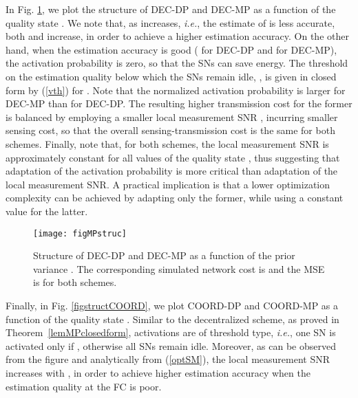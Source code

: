 \documentclass[10pt,twocolumn,twoside]{IEEEtran}
\theoremstyle{plain}
\begin{document}
In Fig. \ref{figstruct}, we plot the structure of DEC-DP and DEC-MP as a function of the quality state .
We note that, as  increases,
\emph{i.e.}, the estimate of  is less accurate,
 both  and  increase,
 in order to achieve a higher estimation accuracy.
 On the other hand, when the estimation accuracy is good ( for DEC-DP and  for DEC-MP),
  the activation probability is zero, so that the SNs can
 save energy.
 The threshold on the estimation quality below which the SNs remain idle, , is given in closed form by (\ref{vth}) for .
Note that the normalized activation probability is larger for DEC-MP than for DEC-DP. The resulting higher transmission cost for the former is balanced
by employing a smaller local measurement SNR , incurring smaller sensing cost,
 so that the overall sensing-transmission cost is the same for both schemes.
Finally, note that, for both schemes, the local measurement SNR is approximately constant for all values of the quality state , thus suggesting
that adaptation of the activation probability is more critical than adaptation of the local measurement SNR. 
A practical implication is that
a lower optimization complexity can be achieved by 
adapting only the former, while
using a constant value for the latter.

\begin{figure}[t]
\centering
\texttt{[image: figMPstruc]}
\vspace{-3mm}
\caption{Structure of DEC-DP and  DEC-MP  as a function of the prior variance .
The corresponding simulated network cost is  and the MSE is  for both schemes.}\vspace{-5mm}
\label{figstruct}
\end{figure}



Finally, in Fig. \ref{figstructCOORD}, we plot COORD-DP and COORD-MP as a function of the quality state .
Similar to the decentralized scheme, as proved in Theorem~\ref{lemMPclosedform},
  activations are of threshold type, \emph{i.e.}, one SN is activated only if , otherwise all SNs remain idle.
Moreover, as can be observed from the figure and analytically from (\ref{optSM}),
 the local measurement SNR increases with , in order to achieve higher estimation accuracy when
the estimation quality at the FC is poor.
\vspace{-3mm}
\end{document}
